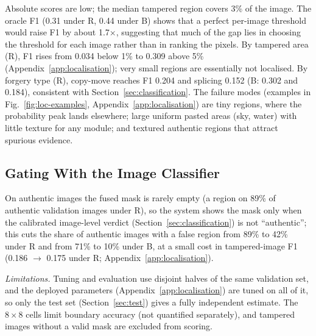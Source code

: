 Absolute scores are low; the median tampered region covers 3\% of the image. The oracle F1 (0.31 under R, 0.44 under B) shows that a perfect per-image threshold would raise F1 by about 1.7$\times$, suggesting that much of the gap lies in choosing the threshold for each image rather than in ranking the pixels. By tampered area (R), F1 rises from 0.034 below 1\% to 0.309 above 5\% (Appendix~\ref{app:localisation}); very small regions are essentially not localised. By forgery type (R), copy-move reaches F1 0.204 and splicing 0.152 (B: 0.302 and 0.184), consistent with Section~\ref{sec:classification}. The failure modes (examples in Fig.~\ref{fig:loc-examples}, Appendix~\ref{app:localisation}) are tiny regions, where the probability peak lands elsewhere; large uniform pasted areas (sky, water) with little texture for any module; and textured authentic regions that attract spurious evidence.

\subsection{Gating With the Image Classifier}\label{sec:localisation-gating}
On authentic images the fused mask is rarely empty (a region on 89\% of authentic validation images under R), so the system shows the mask only when the calibrated image-level verdict (Section~\ref{sec:classification}) is not ``authentic''; this cuts the share of authentic images with a false region from 89\% to 42\% under R and from 71\% to 10\% under B, at a small cost in tampered-image F1 (0.186 $\to$ 0.175 under R; Appendix~\ref{app:localisation}).

\emph{Limitations.} Tuning and evaluation use disjoint halves of the same validation set, and the deployed parameters (Appendix~\ref{app:localisation}) are tuned on all of it, so only the test set (Section~\ref{sec:test}) gives a fully independent estimate. The $8 \times 8$ cells limit boundary accuracy (not quantified separately), and tampered images without a valid mask are excluded from scoring.
